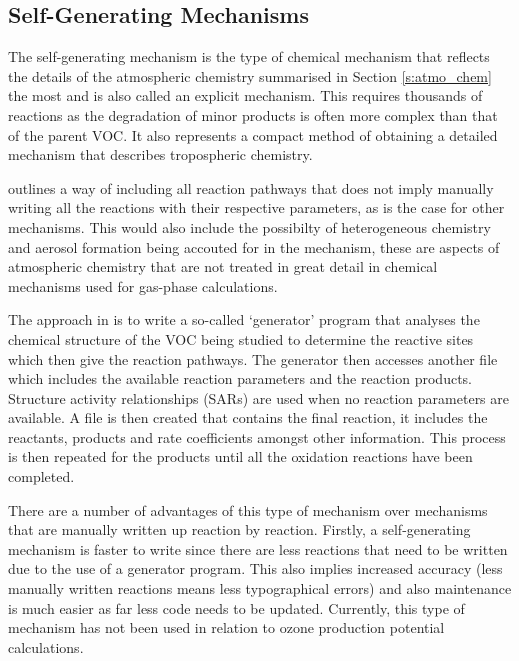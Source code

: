 \subsection{Self-Generating Mechanisms}
The self-generating mechanism is the type of chemical mechanism that reflects the details of the atmospheric chemistry summarised in Section \ref{s:atmo_chem} the most and is also called an explicit mechanism. 
This requires thousands of reactions as the degradation of minor products is often more complex than that of the parent VOC. 
It also represents a compact method of obtaining a detailed mechanism that describes tropospheric chemistry.

\citep{Aumont:2005} outlines a way of including all reaction pathways that does not imply manually writing all the reactions with their respective parameters, as is the case for other mechanisms. 
This would also include the possibilty of heterogeneous chemistry and aerosol formation being accouted for in the mechanism, these are aspects of atmospheric chemistry that are not treated in great detail in chemical mechanisms used for gas-phase calculations.

The approach in \citep{Aumont:2005} is to write a so-called `generator' program that analyses the chemical structure of the VOC being studied to determine the reactive sites which then give the reaction pathways. 
The generator then accesses another file which includes the available reaction parameters and the reaction products. 
Structure activity relationships (SARs) are used when no reaction parameters are available. 
A file is then created that contains the final reaction, it includes the reactants, products and rate coefficients amongst other information. 
This process is then repeated for the products until all the oxidation reactions have been completed.

There are a number of advantages of this type of mechanism over mechanisms that are manually written up reaction by reaction. 
Firstly, a self-generating mechanism is faster to write since there are less reactions that need to be written due to the use of a generator program. 
This also implies increased accuracy (less manually written reactions means less typographical errors) and also maintenance is much easier as far less code needs to be updated. 
Currently, this type of mechanism has not been used in relation to ozone production potential calculations. 


